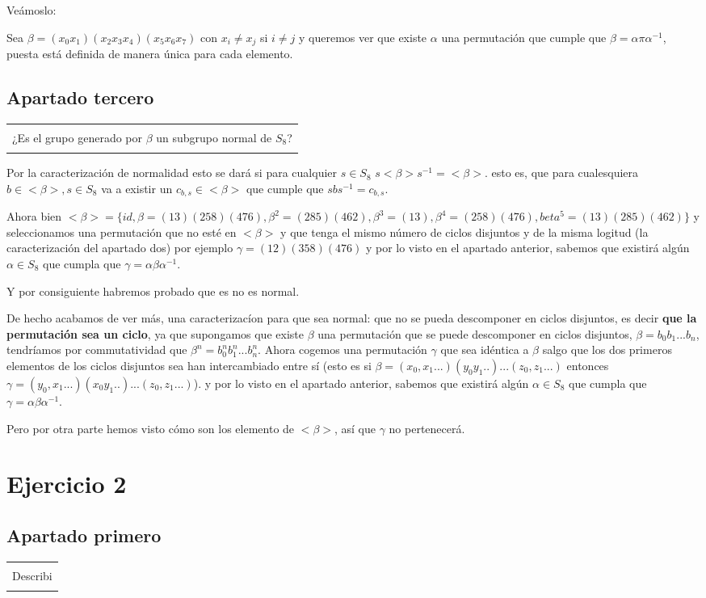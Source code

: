 \documentclass[12pt]{article}
\newenvironment{micaja}
{
    \begin{center}
    \begin{tabular}{|p{0.9\textwidth}|}
    \hline\\
    }   
    {   
    \\\\\hline
    \end{tabular} 
    \end{center}
    }
\begin{document}
Veámoslo: 


Sea $\beta = (x_0 x_1)( x_2 x_3 x_4)(x_5 x_6 x_7)$ con $x_i \neq x_j$ si $i \neq j$ y queremos ver que existe $\alpha$
una permutación que cumple que $\beta = \alpha \pi \alpha^{-1}$, 
puesta está definida de manera única para cada elemento.





\subsection{Apartado tercero}

\begin{micaja}
    ¿Es el grupo generado por $\beta$ un subgrupo normal de $S_8$?
\end{micaja}

Por la caracterización de normalidad esto se dará si para cualquier $s \in S_8$
$s <\beta> s^{-1} = <\beta>.$ esto es, que para cualesquiera $b \in <\beta>, s \in S_8$ va a existir 
un $c_{b,s} \in <\beta>$  que cumple que $s bs^{-1} = c_{b,s}.$

Ahora bien $<\beta> = \{id,\beta = (1 3) (2 5 8) (4 7 6), \beta ^2 =(2 8 5)(4 6 2), \beta ^3 =(1 3), \beta ^4 = (2 5 8) (4 7 6), beta^5 = (1 3)(2 8 5)(4 6 2)\}$
y seleccionamos una permutación que no esté en $<\beta>$ y que tenga el mismo número de ciclos disjuntos y de la misma logitud (la caracterización del apartado dos) 
por ejemplo $\gamma = (1 2)(3 5 8)(4 7 6)$ 
y por lo visto en el apartado anterior, sabemos que existirá algún $\alpha \in S_8$ que cumpla que $\gamma = \alpha \beta \alpha^{-1}.$

Y por consiguiente habremos probado que es no es normal. 


 De hecho acabamos de ver más, una caracterizacíon para que sea normal: 
que no se pueda descomponer en ciclos disjuntos, es decir \textbf{que la permutación sea un ciclo}, 
ya que supongamos que existe $\beta$ una permutación que se puede descomponer en ciclos disjuntos, 
$\beta = b_0 b_1...b_n$, tendríamos por commutatividad que 
$\beta ^n = b_0^n b_1^n...b_n^n$. Ahora cogemos una permutación $\gamma$ que sea idéntica a $\beta$ salgo que los dos primeros elementos
de los ciclos disjuntos sea han intercambiado entre sí (esto es si $\beta = (x_0,x_1...)(y_0 y_1..)...(z_0,z_1...)$ entonces $\gamma =(y_0,x_1...)(x_0 y_1..)...(z_0,z_1...)$). 
y por lo visto en el apartado anterior, sabemos que existirá algún $\alpha \in S_8$ que cumpla que $\gamma = \alpha \beta \alpha^{-1}.$

Pero por otra parte hemos visto cómo son los elemento de $<\beta>$, así que $\gamma$ no pertenecerá. 


\newpage

\section{Ejercicio 2}

\subsection{Apartado primero}

\begin{micaja}
    Describi 
\end{micaja}
\end{document}
